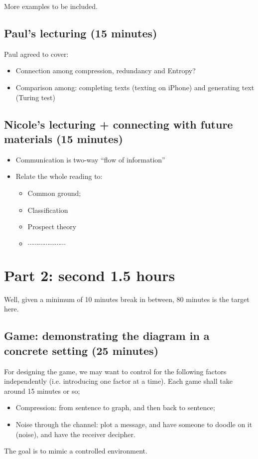 \documentclass[12pt]{article}
\theoremstyle{definition}
\theoremstyle{plain}
\begin{document}
More examples to be included.

\subsection{Paul's lecturing (15 minutes)}
Paul agreed to cover:
\begin{itemize}
    \item Connection among compression, redundancy and Entropy?
    \item Comparison among: completing texts (texting on iPhone) and generating
        text (Turing test)
\end{itemize}



\subsection{Nicole's lecturing + connecting with future materials (15 minutes)}
\begin{itemize}
    \item Communication is two-way ``flow of information''
    \item Relate the whole reading to:
        \begin{itemize}
            \item Common ground;
            \item Classification
            \item Prospect theory
            \item $\cdots$$\cdots$$\cdots$$\cdots$$\cdots$$\cdots$$\cdots$
        \end{itemize}
\end{itemize}



\section{Part 2: second 1.5 hours}
Well, given a minimum of 10 minutes break in between, 80 minutes is the target
here.

\subsection{Game: demonstrating the diagram in a concrete setting (25 minutes) }
For designing the game, we may want to control for the following factors
independently (i.e. introducing one factor at a time). Each game shall take
around 15 minutes or so;
\begin{itemize}
    \item Compression: from sentence to graph, and then back to sentence;
    \item Noise through the channel: plot a message, and have someone to doodle
        on it (noise), and have the receiver decipher.
\end{itemize}
The goal is to mimic a controlled environment.
\end{document}
